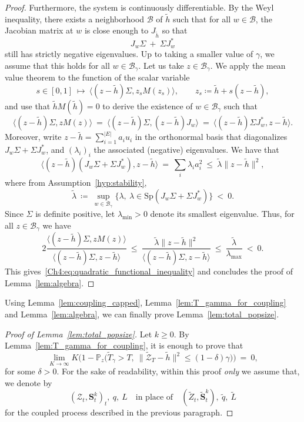 \begin{refsegment}
\begin{proof}
Furthermore, the system is continuously differentiable. By the Weyl inequality, there exists a neighborhood $\mathscr{B}$ of $\tilde h$ such that for all $w\in \mathscr B$, the Jacobian matrix at $w$ is close enough to $J_{\tilde h}$ so that
\[
 J_{w}\Sigma\ +\ \Sigma J_{w}^*
\]
still has strictly negative eigenvalues.
Up to taking a smaller value of $\gamma$, we assume that this holds for all $w\in\mathscr{B}_{\gamma}$.
Let us take $z\in \mathscr{B}_\gamma$. 
We apply the mean value theorem to the function of the scalar variable 
\[
s\in [0,1]\ \longmapsto\ \langle  (z-\tilde{h})\Sigma, z_s M(z_s)\rangle,\qquad z_s \coloneqq\tilde{h}+s(z-\tilde{h}),
\] 
 and use that $\tilde h M(\tilde h)=0$ to derive the existence of $w\in \mathscr{B}_\gamma$ such that
\[
\langle ( z-\tilde h )\Sigma, z M(z)\rangle \ =\ \langle  (z-\tilde h)\Sigma, (z-\tilde h)J_w \rangle\ =\  \langle (z-\tilde h)\Sigma J_w^*, z-\tilde h \rangle.
\]
Moreover, write $z-\tilde h =\sum_{i=1}^{|E|} a_i u_i$ in the orthonormal basis that diagonalizes $J_w \Sigma+ \Sigma J_w^*$, and $(\lambda_{i})_i$ the associated (negative) eigenvalues. We have  that
\[
\langle  (z-\tilde h) (J_w \Sigma+ \Sigma J_w^*), z-\tilde h \rangle \ =\ \sum_i \lambda_i a_i^2  \ \leq\ \widetilde \lambda \lVert z-\tilde h \rVert^2,
\]
where from Assumption~\ref{hyp:stability},
\[
\widetilde\lambda\ \coloneqq\ \sup_{w\in \mathscr{B}_\gamma}\big\{\lambda,\ \lambda \in \mathrm{Sp}(J_w\Sigma+\Sigma J_w^*)\big\}\ <\ 0.
\]
Since $\Sigma$ is definite positive, let $ \lambda_{\min}>0$ denote its smallest eigenvalue.
Thus, for all $z\in\mathscr{B}_\gamma$ we have
\[
2\frac{\langle (z-\tilde h)\Sigma, z M(z) \rangle}{\langle (z-\tilde h)\Sigma, z -\tilde h \rangle}\ \leq\ \frac{   \widetilde \lambda   \lVert z-\tilde h \rVert^2}{\langle (z-\tilde h)\Sigma, z -\tilde h \rangle}\ \leq\ \frac{ \widetilde \lambda }{\lambda_{\max}}\ <\  0.
\]
This gives~\eqref{Ch4:eq:quadratic_functional_inequality} and concludes the proof of Lemma~\ref{lem:algebra}.
\end{proof}
Using Lemma~\ref{lem:coupling_capped}, Lemma~\ref{lem:T_gamma_for_coupling} and Lemma~\ref{lem:algebra}, we can finally prove Lemma~\ref{lem:total_popsize}.


\begin{proof}[Proof of Lemma~\ref{lem:total_popsize}]
Let $k\geq 0$. By Lemma~\ref{lem:T_gamma_for_coupling}, it is enough to prove that 
 \[
\lim_{K\to\infty} K\Big(1- \mathbb{P}_{z}\big( \widetilde T_\gamma > T,\ \lVert \widetilde{\mathcal Z}_T - \tilde h\rVert^2 \leq (1-\delta)\gamma\big)\Big)\ =\ 0,
 \]
for some $\delta>0$.
For the sake of readability, within this proof \textit{only} we assume that, we denote by 
\[
(\mathcal{Z}_t, \bm S^k_t)_t,\ q,\ L\quad \text{in place of}\quad (\widetilde{Z}_t, \widetilde{ \bm S}^k_t),\ \widetilde{q},\ \widetilde{L}
\]
for the coupled process described in the previous paragraph. 


\end{proof}
\end{refsegment}
